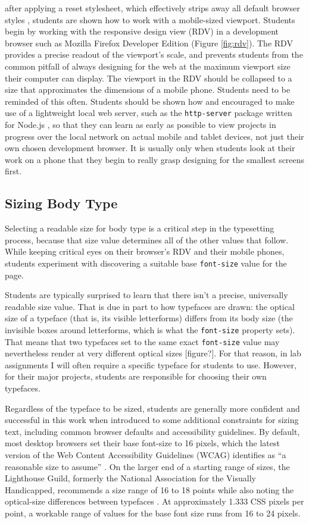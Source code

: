 \documentclass[sigplan,screen]{acmart}
\begin{document}
after applying a reset stylesheet, which effectively strips away all default browser styles \cite{em:rc}, students are shown how to work with a mobile-sized viewport. Students begin by working with the responsive design view (RDV) in a development browser such as Mozilla Firefox Developer Edition (Figure \ref{fig:rdv}). The RDV provides a precise readout of the viewport's scale, and prevents students from the common pitfall of always designing for the web at the maximum viewport size their computer can display. The viewport in the RDV should be collapsed to a size that approximates the dimensions of a mobile phone. Students need to be reminded of this often. Students should be shown how and encouraged to make use of a lightweight local web server, such as the \verb|http-server| package written for Node.js \cite{npm:http}, so that they can learn as early as possible to view projects in progress over the local network on actual mobile and tablet devices, not just their own chosen development browser. It is usually only when students look at their work on a phone that they begin to really grasp designing for the smallest screens first.

\subsection{Sizing Body Type}

Selecting a readable size for body type is a critical step in the typesetting process, because that size value determines all of the other values that follow. While keeping critical eyes on their browser's RDV and their mobile phones, students experiment with discovering a suitable base \verb|font-size| value for the page.

Students are typically surprised to learn that there isn’t a precise, universally readable size value. That is due in part to how typefaces are drawn: the optical size of a typeface (that is, its visible letterforms) differs from its body size (the invisible boxes around letterforms, which is what the \verb|font-size| property sets). That means that two typefaces set to the same exact \verb|font-size| value may nevertheless render at very different optical sizes [figure?]. For that reason, in lab assignments I will often require a specific typeface for students to use. However, for their major projects, students are responsible for choosing their own typefaces.

Regardless of the typeface to be sized, students are generally more confident and successful in this work when introduced to some additional constraints for sizing text, including common browser defaults and accessibility guidelines. By default, most desktop browsers set their base font-size to 16 pixels, which the latest version of the Web Content Accessibility Guidelines (WCAG) identifies as “a reasonable size to assume” \cite{w3c:wcag}. On the larger end of a starting range of sizes, the Lighthouse Guild, formerly the National Association for the Visually Handicapped, recommends a size range of 16 to 18 points while also noting the optical-size differences between typefaces \cite{lhg:mtl}. At approximately 1.333 CSS pixels per point, a workable range of values for the base font size runs from 16 to 24 pixels.
\end{document}
